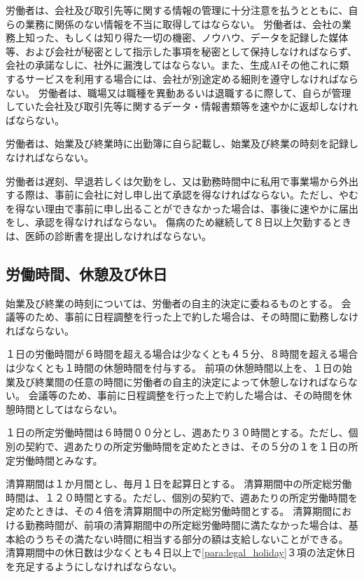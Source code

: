 \documentclass[10pt,a4paper,uplatex]{jsarticle}
\begin{document}
労働者は、会社及び取引先等に関する情報の管理に十分注意を払うとともに、自らの業務に関係のない情報を不当に取得してはならない。
\label{para:confidentiality}
\term
労働者は、会社の業務上知った、もしくは知り得た一切の機密、ノウハウ、データを記録した媒体等、および会社が秘密として指示した事項を秘密として保持しなければならず、会社の承諾なしに、社外に漏洩してはならない。また、生成AIその他これに類するサービスを利用する場合には、会社が別途定める細則を遵守しなければならない。
\term
労働者は、職場又は職種を異動あるいは退職するに際して、自らが管理していた会社及び取引先等に関するデータ・情報書類等を速やかに返却しなければならない。

労働者は、始業及び終業時に出勤簿に自ら記載し、始業及び終業の時刻を記録しなければならない。

労働者は遅刻、早退若しくは欠勤をし、又は勤務時間中に私用で事業場から外出する際は、事前に会社に対し申し出て承認を得なければならない。ただし、やむを得ない理由で事前に申し出ることができなかった場合は、事後に速やかに届出をし、承認を得なければならない。
\term
傷病のため継続して８日以上欠勤するときは、医師の診断書を提出しなければならない。




\subsection{労働時間、休憩及び休日}

\label{para:time}
始業及び終業の時刻については、労働者の自主的決定に委ねるものとする。
\term
会議等のため、事前に日程調整を行った上で約した場合は、その時間に勤務しなければならない。

１日の労働時間が６時間を超える場合は少なくとも４５分、８時間を超える場合は少なくとも１時間の休憩時間を付与する。
\term
前項の休憩時間以上を、１日の始業及び終業間の任意の時間に労働者の自主的決定によって休憩しなければならない。
\term
会議等のため、事前に日程調整を行った上で約した場合は、その時間を休憩時間としてはならない。

\label{para:standardworktime}
１日の所定労働時間は６時間００分とし、週あたり３０時間とする。ただし、個別の契約で、週あたりの所定労働時間を定めたときは、その５分の１を１日の所定労働時間とみなす。

清算期間は１か月間とし、毎月１日を起算日とする。
\term
\label{para:totalworktime}
清算期間中の所定総労働時間は、１２０時間とする。ただし、個別の契約で、週あたりの所定労働時間を定めたときは、その４倍を清算期間中の所定総労働時間とする。
\term
清算期間における勤務時間が、前項の清算期間中の所定総労働時間に満たなかった場合は、基本給のうちその満たない時間に相当する部分の額は支給しないことができる。
\term
清算期間中の休日数は少なくとも４日以上で\ref{para:legal_holiday}３項の法定休日を充足するようにしなければならない。
\end{document}
